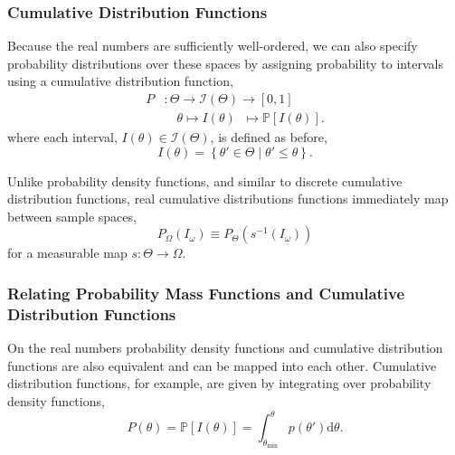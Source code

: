 \documentclass[11pt, oneside]{article}
\newcommand{\dd}{ \mathrm{d} }
\newcommand{\PP}{ \mathbb{P} }
\begin{document}
\subsubsection{Cumulative Distribution Functions}

Because the real numbers are sufficiently well-ordered, we can also 
specify probability distributions over these spaces by assigning probability 
to intervals using a cumulative distribution function,
%
\begin{align*}
P 
&: \Theta \rightarrow \mathcal{I} \! \left( \Theta \right) 
\rightarrow 
\left[0, 1 \right]
\\
&\quad \theta 
\mapsto 
I \! \left( \theta \right) \;\; 
\mapsto 
\PP \! \left[ I \! \left( \theta \right) \right].
\end{align*}
%
where each interval, $I \! \left( \theta \right) \in \mathcal{I} \! 
\left( \Theta \right)$, is defined as before,
%
\begin{equation*}
I \! \left( \theta \right) = \left\{ \theta' \in \Theta \mid \theta' \leq \theta \right\}.
\end{equation*}

Unlike probability density functions, and similar to discrete cumulative
distribution functions, real cumulative distributions functions
immediately map between sample spaces,
%
\begin{equation*}
P_{\Omega} \! \left( I_{\omega} \right) 
\equiv 
P_{\Theta} \! \left( s^{-1} \! \left( I_{\omega} \right) \right)
\end{equation*}
%
for a measurable map $s : \Theta \rightarrow \Omega$.

\subsubsection{Relating Probability Mass Functions and Cumulative 
Distribution Functions}

On the real numbers probability density functions and cumulative 
distribution functions are also equivalent and can be mapped into 
each other.  Cumulative distribution functions, for example, are given 
by integrating over probability density functions,
%
\begin{equation*}
P \! \left( \theta \right)
= \PP \! \left[ I \! \left( \theta \right) \right]
= \int_{\theta_{\min}}^{\theta} p \! \left( \theta' \right) \dd \theta.
\end{equation*}
\end{document}
